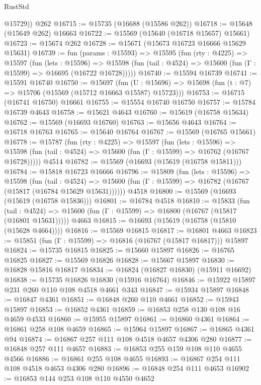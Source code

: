 \begin{lexlean}{RustStd}
\begin{coremodule}
{\begin{coremodule}
{{{{{{{{{{{{{{{{{{{{{{{{{{{{{{{{{{{{{{{{{{{{{{{{{{{{{{{{{{{{        @15729))
    @262
@16715 := @15735 (@16688 (@15586 @262))
@16718 := @15648 (@15649 @262) @16663
@16722 := @15569 (@15640 (@16718 @15657) @15661)
@16723 := @15674 @262
@16728 := @15671 (@15673 @16723 @16666 @15629 @15631)
@16739 := fun (params : @15593) =>
  @15595
    (fun (rty : @4225) =>
    @15597
      (fun (lets : @15596) =>
      @15598 (fun (tail : @4524) => @15600 (fun (Γ : @15599) => @16695 (@16722 @16728)))))
@16740 := @15594 @16739
@16741 := @15591 @16740
@16750 := @15697
    (fun (U : @15696) => @15698 (fun (t : @7) => @15706 (@15569 (@15712 @16663 @15587) @15723)))
@16753 := @16715 (@16741 @16750) @16661
@16755 := @15554 @16740 @16750
@16757 := @15784 @16739 @4643
@16758 := @15621 @4643
@16760 := @15619 (@16758 @15634)
@16762 := @15569 (@16693 @16760)
@16763 := @15656 @4643
@16764 := @16718 @16763
@16765 := @15640 @16764
@16767 := @15569 (@16765 @15661)
@16778 := @15787
    (fun (rty : @4225) =>
    @15597
      (fun (lets : @15596) =>
      @15598 (fun (tail : @4524) => @15600 (fun (Γ : @15599) => @16762 (@16767 @16728)))))
    @4514
@16782 := @15569 (@16693 (@15619 (@16758 @15811)))
@16784 := @15818 @16723 @16666
@16796 := @15809
    (fun (lets : @15596) =>
    @15598
      (fun (tail : @4524) =>
      @15600 (fun (Γ : @15599) => @16782 (@16767 (@15817 (@16784 @15629 @15631))))))
    @4518
@16800 := @15569 (@16693 (@15619 (@16758 @15836)))
@16801 := @16784 @4518
@16810 := @15833
    (fun (tail : @4524) => @15600 (fun (Γ : @15599) => @16800 (@16767 (@15817 (@16801 @15631)))))
    @4663
@16815 := @16693 (@15619 (@16758 (@15810 (@15628 @4664))))
@16816 := @15569 @16815
@16817 := @16801 @4663
@16823 := @15851 (fun (Γ : @15599) => @16816 (@16767 (@15817 @16817))) @15897
@16824 := @15735 @16815
@16825 := @15660 @15897
@16826 := @16765 @16825
@16827 := @15569 @16826
@16828 := @15667 @15897
@16830 := @16828 @15816 @16817
@16834 := @16824 (@16827 @16830) (@15911 @16692)
@16838 := @15735 @16826 @16830 (@15916 @16764)
@16846 := @15922 @15897 @231 @260 @110 @108 @4518 @4661 @343
@16847 := @15934 @15897
@16848 := @16847 @4361
@16851 := @16848 @260 @110 @4661
@16852 := @15943 @15897
@16853 := @16852 @4361
@16859 := @16853 @258 @130 @108 @16 @4659 @4533
@16860 := @15955 @15897
@16861 := @16860 @4361
@16864 := @16861 @258 @108 @4659
@16865 := @15964 @15897
@16867 := @16865 @4361 @94
@16874 := @16867 @257 @111 @108 @4518 @4657 @4306 @280
@16877 := @16848 @257 @111 @4657
@16883 := @16853 @255 @159 @108 @110 @4655 @4566
@16886 := @16861 @255 @108 @4655
@16893 := @16867 @254 @111 @108 @4518 @4653 @4306 @280
@16896 := @16848 @254 @111 @4653
@16902 := @16853 @144 @253 @108 @110 @4550 @4652
}}}}}}}}}}}}}}}}}}}}}}}}}}}}}}}}}}}}}}}}}}}}}}}}}}}}}}}}}}}}
\end{coremodule}}
\end{coremodule}
\end{lexlean}
